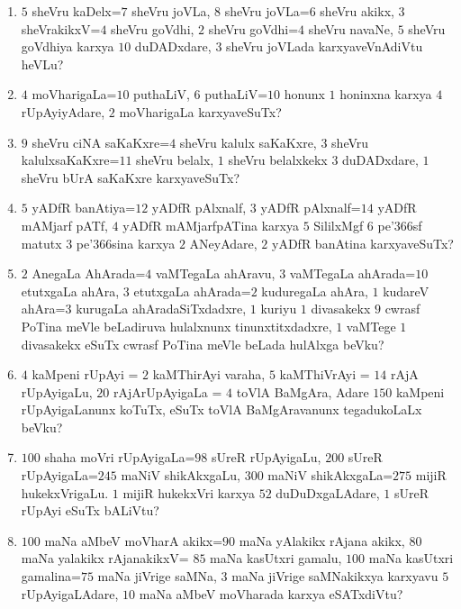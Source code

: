 \begin{enumerate}[\rm(1)]
\item $5$ sheVru kaDelx=$7$ sheVru joVLa, $8$ sheVru joVLa=$6$ sheVru akikx, $3$ sheVrakikxV=$4$ sheVru goVdhi, $2$ sheVru goVdhi=$4$ sheVru navaNe, $5$ sheVru goVdhiya karxya $10$ duDADxdare, $3$ sheVru joVLada karxyaveVnAdiVtu heVLu?

\item $4$ moVharigaLa=$10$ puthaLiV, $6$ puthaLiV=$10$ honunx $1$ honinxna karxya $4$ rUpAyiyAdare, $2$ moVharigaLa karxyaveSuTx?

\item $9$ sheVru ciNA saKaKxre=$4$ sheVru kalulx saKaKxre, $3$ sheVru kalulxsaKaKxre=$11$ sheVru belalx, $1$ sheVru belalxkekx $3$ duDADxdare, $1$ sheVru bUrA saKaKxre karxyaveSuTx?

\item $5$ yADfR banAtiya=$12$ yADfR pAlxnalf, $3$ yADfR pAlxnalf=$14$ yADfR mAMjarf pATf, $4$ yADfR mAMjarfpATina karxya $5$ SililxMgf $6$ pe\char'366sf matutx $3$ pe\char'366sina karxya $2$ ANeyAdare, $2$ yADfR banAtina karxyaveSuTx?

\item $2$ AnegaLa AhArada=$4$ vaMTegaLa ahAravu, $3$ vaMTegaLa ahArada=$10$ etutxgaLa ahAra, $3$ etutxgaLa ahArada=$2$ kuduregaLa ahAra, $1$ kudareV ahAra=$3$ kurugaLa ahAradaSiTxdadxre, $1$ kuriyu $1$ divasakekx $9$ cwrasf PoTina meVle beLadiruva hulalxnunx tinunxtitxdadxre, $1$ vaMTege $1$ divasakekx eSuTx cwrasf PoTina meVle beLada hulAlxga beVku?

\item $4$ kaMpeni rUpAyi = $2$ kaMThirAyi varaha, $5$ kaMThiVrAyi = $14$ rAjA rUpAyigaLu, $20$ rAjA\break rUpAyigaLa = $4$ toVlA BaMgAra, Adare $150$ kaMpeni rUpAyigaLanunx koTuTx, eSuTx toVlA BaMgAravanunx tegadukoLaLx beVku?

\item $100$ shaha moVri rUpAyigaLa=$98$ sUreR rUpAyigaLu, $200$ sUreR rUpAyigaLa=$245$ maNiV shikAkxgaLu, $300$ maNiV shikAkxgaLa=$275$ mijiR hukekxVrigaLu. $1$ mijiR hukekxVri karxya $52$ duDuDxgaLAdare, $1$ sUreR rUpAyi eSuTx bALiVtu?

\item $100$ maNa aMbeV moVharA akikx=$90$ maNa yAlakikx rAjana akikx, $80$ maNa yalakikx rAjanakikxV= $85$ maNa kasUtxri gamalu, $100$ maNa kasUtxri gamalina=$75$ maNa jiVrige saMNa, $3$ maNa jiVrige saMNakikxya karxyavu $5$ rUpAyigaLAdare, $10$ maNa aMbeV moVharada karxya eSATxdiVtu?
\end{enumerate}
